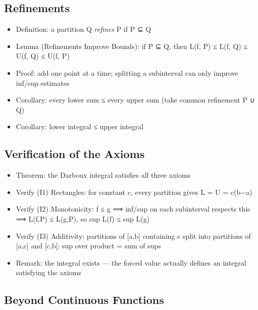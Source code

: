 \documentclass[
  10pt,
  letterpaper,
]{scrbook}
\providecommand{\tightlist}{%
  \setlength{\itemsep}{0pt}\setlength{\parskip}{0pt}}
\begin{document}
\subsection{Refinements}\label{refinements}

\begin{itemize}
\tightlist
\item
  Definition: a partition Q \emph{refines} P if P ⊆ Q
\item
  Lemma (Refinements Improve Bounds): if P ⊆ Q, then L(f, P) ≤ L(f, Q) ≤
  U(f, Q) ≤ U(f, P)
\item
  Proof: add one point at a time; splitting a subinterval can only
  improve inf/sup estimates
\item
  Corollary: every lower sum ≤ every upper sum (take common refinement P
  ∪ Q)
\item
  Corollary: lower integral ≤ upper integral
\end{itemize}

\subsection{Verification of the
Axioms}\label{verification-of-the-axioms}

\begin{itemize}
\tightlist
\item
  Theorem: the Darboux integral satisfies all three axioms
\item
  Verify (I1) Rectangles: for constant c, every partition gives L = U =
  c(b−a)
\item
  Verify (I2) Monotonicity: f ≤ g ⟹ inf/sup on each subinterval respects
  this ⟹ L(f,P) ≤ L(g,P), so sup L(f) ≤ sup L(g)
\item
  Verify (I3) Additivity: partitions of {[}a,b{]} containing c split
  into partitions of {[}a,c{]} and {[}c,b{]}; sup over product = sum of
  sups
\item
  Remark: the integral exists --- the forced value actually defines an
  integral satisfying the axioms
\end{itemize}

\subsection{Beyond Continuous
Functions}\label{beyond-continuous-functions}
\end{document}
